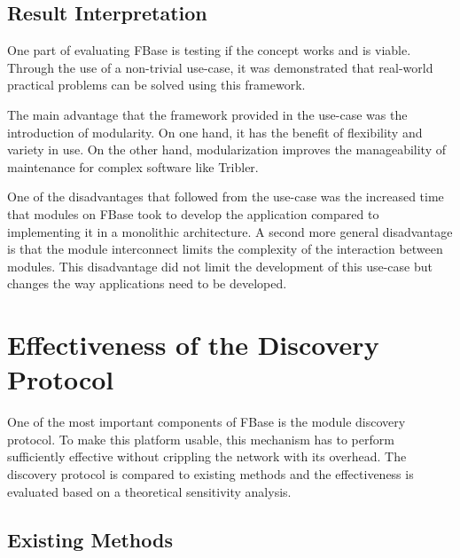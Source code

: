 
\subsection{Result Interpretation}

One part of evaluating FBase is testing if the concept works and is viable. Through the use of a non-trivial use-case, it was demonstrated that real-world practical problems can be solved using this framework.

The main advantage that the framework provided in the use-case was the introduction of modularity. On one hand, it has the benefit of flexibility and variety in use. On the other hand, modularization improves the manageability of maintenance for complex software like Tribler.

One of the disadvantages that followed from the use-case was the increased time that modules on FBase took to develop the application compared to implementing it in a monolithic architecture. A second more general disadvantage is that the module interconnect limits the complexity of the interaction between modules. This disadvantage did not limit the development of this use-case but changes the way applications need to be developed.


\section{Effectiveness of the Discovery Protocol}


One of the most important components of FBase is the module discovery protocol. To make this platform usable, this mechanism has to perform sufficiently effective without crippling the network with its overhead. The discovery protocol is compared to existing methods and the effectiveness is evaluated based on a theoretical sensitivity analysis.

\subsection{Existing Methods}

